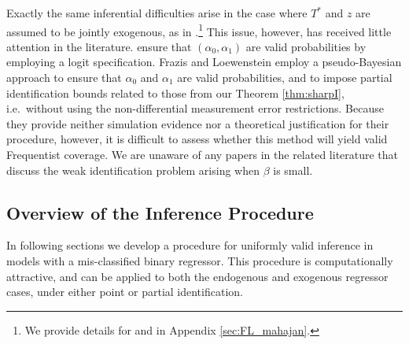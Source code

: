 Exactly the same inferential difficulties arise in the case where $T^*$ and $z$ are assumed to be jointly exogenous, as in \cite{KRS,BBS,FL,Mahajan,Lewbel}.\footnote{We provide details for \cite{FL} and \cite{Mahajan} in Appendix \ref{sec:FL_mahajan}.}
This issue, however, has received little attention in the literature. 
\cite{KRS} ensure that $(\alpha_0, \alpha_1)$ are valid probabilities by employing a logit specification.
Frazis and Loewenstein employ a pseudo-Bayesian approach to ensure that $\alpha_0$ and $\alpha_1$ are valid probabilities, and to impose partial identification bounds related to those from our Theorem \ref{thm:sharpI}, i.e.\ without using the non-differential measurement error restrictions.
Because they provide neither simulation evidence nor a theoretical justification for their procedure, however, it is difficult to assess whether this method will yield valid Frequentist coverage.
We are unaware of any papers in the related literature that discuss the weak identification problem arising when $\beta$ is small.


\subsection{Overview of the Inference Procedure}
In following sections we develop a procedure for uniformly valid inference in models with a mis-classified binary regressor.
This procedure is computationally attractive, and can be applied to both the endogenous and exogenous regressor cases, under either point or partial identification.

